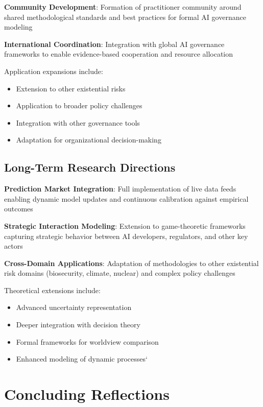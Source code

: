 \documentclass[
  11pt,
  letterpaper,
]{book}
\providecommand{\tightlist}{%
  \setlength{\itemsep}{0pt}\setlength{\parskip}{0pt}}
\begin{document}
\textbf{Community Development}: Formation of practitioner community
around shared methodological standards and best practices for formal AI
governance modeling

\textbf{International Coordination}: Integration with global AI
governance frameworks to enable evidence-based cooperation and resource
allocation

Application expansions include:

\begin{itemize}
\tightlist
\item
  Extension to other existential risks
\item
  Application to broader policy challenges
\item
  Integration with other governance tools
\item
  Adaptation for organizational decision-making
\end{itemize}

\subsection{Long-Term Research Directions}\label{sec-long-term-research}

\textbf{Prediction Market Integration}: Full implementation of live data
feeds enabling dynamic model updates and continuous calibration against
empirical outcomes

\textbf{Strategic Interaction Modeling}: Extension to game-theoretic
frameworks capturing strategic behavior between AI developers,
regulators, and other key actors

\textbf{Cross-Domain Applications}: Adaptation of methodologies to other
existential risk domains (biosecurity, climate, nuclear) and complex
policy challenges

Theoretical extensions include:

\begin{itemize}
\tightlist
\item
  Advanced uncertainty representation
\item
  Deeper integration with decision theory
\item
  Formal frameworks for worldview comparison
\item
  Enhanced modeling of dynamic processes`
\end{itemize}

\section{Concluding Reflections}\label{sec-concluding-reflections}
\end{document}

